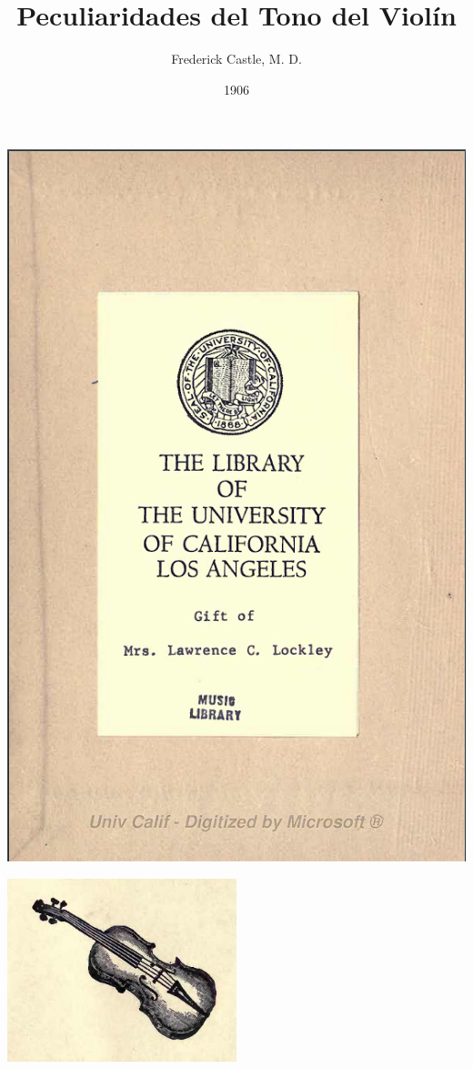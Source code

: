 \documentclass[12pt]{book}
\title{Peculiaridades del Tono del Violín}
\author{Frederick Castle, M. D.}
\date{1906}
\begin{document}
\maketitle
\begin{center}
\includegraphics[width=1\textwidth]{./img/portada.png} %
\end{center}
\begin{center}
\includegraphics[width=0.5\textwidth]{./img/violin.png} %
\end{center}
\end{document}
